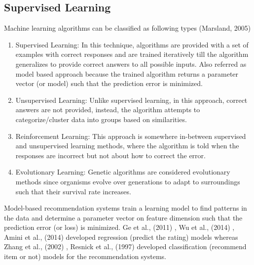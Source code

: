 \documentclass[12pt]{article}
\begin{document}
\subsection{Supervised Learning}
Machine learning algorithms can be classified as following types (Marsland, 2005) \cite{marsland}
\begin{enumerate}
	\item Supervised Learning: In this technique, algorithms are provided with a set of examples with correct responses and are trained iteratively till the algorithm generalizes to provide correct answers to all possible inputs. Also referred as model based approach because the trained algorithm returns a parameter vector (or model) such that the prediction error is minimized. 
	\item Unsupervised Learning: Unlike supervised learning, in this approach, correct answers are not provided, instead, the algorithm attempts to categorize/cluster data into groups based on similarities.
	\item Reinforcement Learning: This approach is somewhere in-between supervised and unsupervised learning methods, where the algorithm is told when the responses are incorrect but not about how to correct the error.
	\item Evolutionary Learning: Genetic algorithms are considered evolutionary methods since organisms evolve over generations to adapt to surroundings such that their survival rate increases.
\end{enumerate}

Model-based recommendation systems train a learning model to find patterns in the data and determine a parameter vector on feature dimension such that the prediction error (or loss) is minimized. Ge et al., (2011) \cite{ge}, Wu et al., (2014) \cite{wu}, Amini et al., (2014) \cite{amini} developed regression (predict the rating) models whereas Zhang et al., (2002) \cite{zhang-iyengar}, Resnick et al., (1997) \cite{resnick} developed classification (recommend item or not) models for the recommendation systems.
\end{document}
